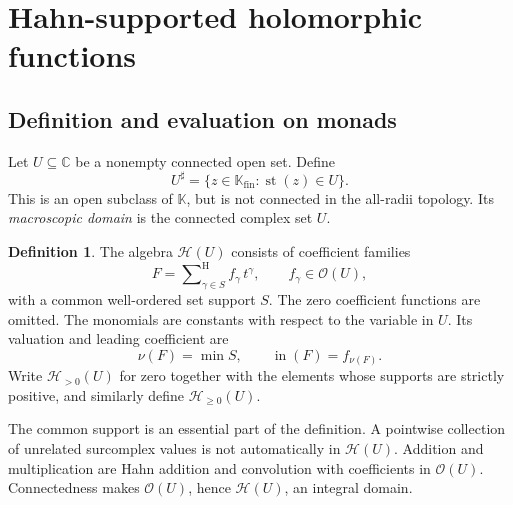 \documentclass[11pt,oneside]{article}
\theoremstyle{definition}\newtheorem{definition}[theorem]{Definition}
\newcommand{\K}{\mathbb K}
\newcommand{\C}{\mathbb C}
\newcommand{\HH}{\mathcal H}
\newcommand{\OO}{\mathcal O}
\newcommand{\st}{\operatorname{st}}
\newcommand{\Hsum}{\mathop{\sum}\nolimits^{\mathrm H}}
\newcommand{\val}{\nu}
\newcommand{\Fin}{\K_{\mathrm{fin}}}
\newcommand{\lead}{\operatorname{in}}
\begin{document}
\section{Hahn-supported holomorphic functions}\label{sec:H}
\subsection{Definition and evaluation on monads}
Let $U\subseteq\C$ be a nonempty connected open set. Define
\[
 U^\sharp=\{z\in\Fin:\st(z)\in U\}.
\]
This is an open subclass of $\K$, but is not connected in the all-radii topology. Its \emph{macroscopic domain} is the connected complex set $U$.

\begin{definition}\label{def:H}
The algebra $\HH(U)$ consists of coefficient families
\begin{equation}\label{eq:H}
 F=\Hsum_{\gamma\in S}f_\gamma\,t^\gamma,
 \qquad f_\gamma\in\OO(U),
\end{equation}
with a common well-ordered set support $S$. The zero coefficient functions are omitted. The monomials are constants with respect to the variable in $U$.
Its valuation and leading coefficient are
\[
 \val(F)=\min S,\qquad \lead(F)=f_{\val(F)}.
\]
Write $\HH_{>0}(U)$ for zero together with the elements whose supports are strictly positive, and similarly define $\HH_{\geq0}(U)$.
\end{definition}
The common support is an essential part of the definition. A pointwise collection of unrelated surcomplex values is not automatically in $\HH(U)$. Addition and multiplication are Hahn addition and convolution with coefficients in $\OO(U)$. Connectedness makes $\OO(U)$, hence $\HH(U)$, an integral domain.
\end{document}
